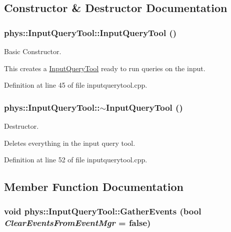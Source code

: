 \subsection{Constructor \& Destructor Documentation}
\hypertarget{classphys_1_1InputQueryTool_a10a997ec2e072d31808c794542c0516f}{
\subsubsection[{InputQueryTool}]{\setlength{\rightskip}{0pt plus 5cm}phys::InputQueryTool::InputQueryTool ()}}
\label{da/d96/classphys_1_1InputQueryTool_a10a997ec2e072d31808c794542c0516f}


Basic Constructor. 

This creates a \hyperlink{classphys_1_1InputQueryTool}{InputQueryTool} ready to run queries on the input. 

Definition at line 45 of file inputquerytool.cpp.

\hypertarget{classphys_1_1InputQueryTool_a6a37616800928b691932045ba34759b8}{
\subsubsection[{$\sim$InputQueryTool}]{\setlength{\rightskip}{0pt plus 5cm}phys::InputQueryTool::$\sim$InputQueryTool ()}}
\label{da/d96/classphys_1_1InputQueryTool_a6a37616800928b691932045ba34759b8}


Destructor. 

Deletes everything in the input query tool. 

Definition at line 52 of file inputquerytool.cpp.



\subsection{Member Function Documentation}
\hypertarget{classphys_1_1InputQueryTool_a9779d812418f1fddb0880df0c607242b}{
\subsubsection[{GatherEvents}]{\setlength{\rightskip}{0pt plus 5cm}void phys::InputQueryTool::GatherEvents (bool {\em ClearEventsFromEventMgr} = {\ttfamily false})}}
\label{da/d96/classphys_1_1InputQueryTool_a9779d812418f1fddb0880df0c607242b}


